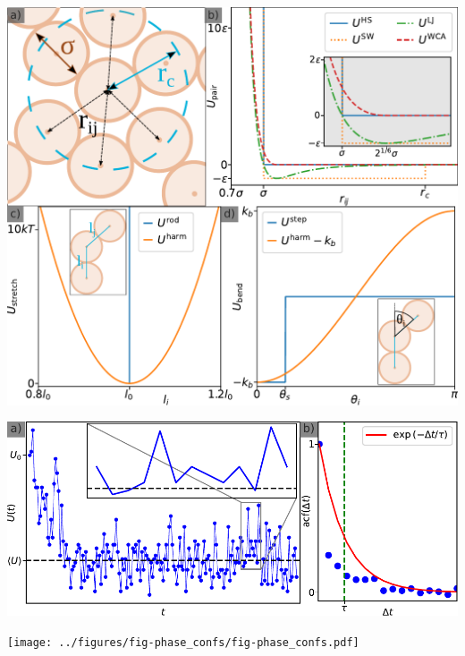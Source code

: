 \documentclass[aspectratio=169]{beamer}
\begin{document}
\begin{frame}[c]{}

  \centering
  \includegraphics[height=\textheight]{../figures/fig-potentials/fig-potentials.pdf}

\end{frame}

\begin{frame}[c]{}

  \centering
  \includegraphics[width=\textwidth]{../figures/fig-acf/fig-acf.pdf}

\end{frame}

\begin{frame}[c]{}

  \centering
  \texttt{[image: ../figures/fig-phase\_confs/fig-phase\_confs.pdf]}

\end{frame}
\end{document}

